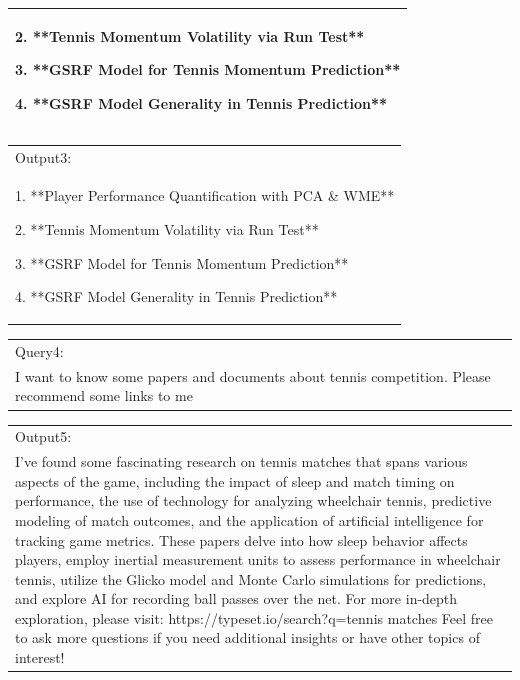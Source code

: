 \documentclass[12pt]{article}%
\begin{document}
\begin{table}[!ht]
\begin{tabular}{|p{17cm}|}
			2. **Tennis Momentum Volatility via Run Test**
			
			3. **GSRF Model for Tennis Momentum Prediction**
			
			4. **GSRF Model Generality in Tennis Prediction**  \\
			
			\hline
		\end{tabular}

	
	
	
	\end{table}
	
\thispagestyle{empty}
	
		\begin{table}[!ht]
		\centering

		\begin{tabular}{|p{17cm}|}
			\hline
			Output3:\\
			1. **Player Performance Quantification with PCA \& WME**
			
			2. **Tennis Momentum Volatility via Run Test**
			
			3. **GSRF Model for Tennis Momentum Prediction**
			
			4. **GSRF Model Generality in Tennis Prediction**  \\
			
			\hline
		\end{tabular}
		\begin{tabular}{|p{17cm}|}
			\hline  \rowcolor{black!8}
			Query4:\\  \rowcolor{black!8}
			I want to know some papers and documents about tennis competition. Please recommend some links to me \\
			\hline
		\end{tabular}
		\begin{tabular}{|p{17cm}|}
			Output5:\\
			I've found some fascinating research on tennis matches that spans various aspects of the game, including the impact of sleep and match timing on performance, the use of technology for analyzing wheelchair tennis, predictive modeling of match outcomes, and the application of artificial intelligence for tracking game metrics. These papers delve into how sleep behavior affects players, employ inertial measurement units to assess performance in wheelchair tennis, utilize the Glicko model and Monte Carlo simulations for predictions, and explore AI for recording ball passes over the net.
			For more in-depth exploration, please visit: https://typeset.io/search?q=tennis matches
			Feel free to ask more questions if you need additional insights or have other topics of interest!  \\
			

\end{tabular}
\end{table}
\end{document}
